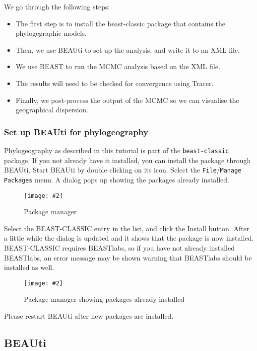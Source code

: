 \documentclass{article}
\newcommand{\includeimage}[2][]{%
\texttt{[image: \#2]}
}
\begin{document}
We go through the following steps:
\begin{itemize}
\item The first step is to install the beast-classic package that contains the phylogegraphic models. 
\item Then, we use BEAUti to set up the analysis, and write it to an XML file.
\item We use BEAST to run the MCMC analysis based on the XML file.
\item The results will need to be checked for convergence using Tracer.
\item Finally, we post-process the output of the MCMC so we can visualise the geographical dispersion.
\end{itemize}

\subsubsection*{Set up BEAUti for phylogeography}

Phylogeography as described in this tutorial is part of the {\tt beast-classic} package.
If you not already have it installed, you can
install the package through BEAUti. Start BEAUti by double clicking on its icon. 
Select the \texttt{File}/\texttt{Manage Packages} menu. A dialog pops up showing the packages already installed. 

\begin{figure}
\centering	
\includeimage[scale=0.3]{figures/addonmgr}
\caption{Package manager}
\label{fig.datapartition} 
\end{figure}


Select the BEAST-CLASSIC entry in the list, and click the Install button. After a little while the dialog is updated and it shows that the package is now installed.
BEAST-CLASSIC requires BEASTlabs, so if you have not already installed BEASTlabs, an error message may be shown warning that BEASTlabs should be installed as well.

\begin{figure}
\centering	
\includeimage[scale=0.3]{figures/addonmgr2}
\caption{Package manager showing packages already installed}
\label{fig.datapartition} 
\end{figure}

Please restart BEAUti after new packages are installed. 


\subsection*{BEAUti}
\end{document}
